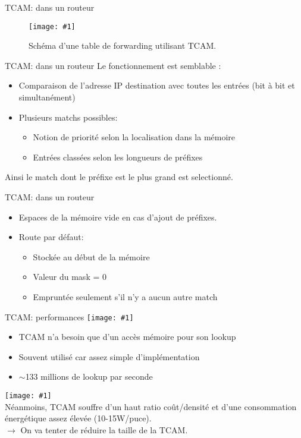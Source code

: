 \documentclass{beamer}
\newcommand{\imageR}[2]{\texttt{[image: \#1]}}
\begin{document}
\begin{frame}{TCAM: dans un routeur}
\begin{figure}
	\begin{center}
	\imageR{TCAM.png}{250}
	\caption{Schéma d'une table de forwarding utilisant TCAM.}
	\end{center}	
\end{figure}
\end{frame}

\begin{frame}{TCAM: dans un routeur}
Le fonctionnement est semblable : 
\begin{itemize}
\item Comparaison de l'adresse IP destination avec toutes les entrées (bit à bit et simultanément)
\pause \item Plusieurs matchs possibles:
\begin{itemize}
\item Notion de priorité selon la localisation dans la mémoire
\item Entrées classées selon les longueurs de préfixes
\end{itemize}
\end{itemize}

Ainsi le match dont le préfixe est le plus grand est selectionné. \\
\end{frame}

\begin{frame}{TCAM: dans un routeur}
\begin{itemize}
\item Espaces de la mémoire vide en cas d'ajout de préfixes.
\item Route par défaut: 
\begin{itemize}
\item Stockée au début de la mémoire
\item Valeur du mask = 0
\item Empruntée seulement s'il n'y a aucun autre match
\end{itemize}
\end{itemize}
\end{frame}
\begin{frame}{TCAM: performances}
\imageR{good.png}{15}
\begin{itemize}
\item TCAM n'a besoin que d'un accès mémoire pour son lookup 
\item Souvent utilisé car assez simple d'implémentation
\item $\sim$133 millions de lookup par seconde 
\end{itemize}
\pause
\imageR{bad.png}{15} \\
Néanmoins, TCAM souffre d'un haut ratio coût/densité et d'une consommation 
énergétique assez élevée (10-15W/puce). \\
$\rightarrow$ On va tenter de réduire la taille de la TCAM.
\end{frame}
\end{document}
